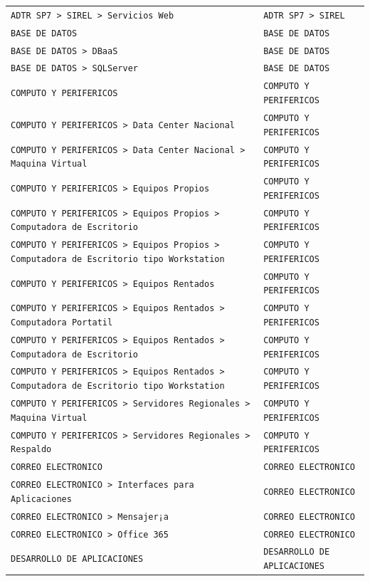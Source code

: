 \begin{longtable}{>{\raggedright\arraybackslash}p{} >{\raggedright\arraybackslash}p{}}
\texttt{ADTR SP7 > SIREL > Servicios Web} & \texttt{ADTR SP7 > SIREL} \\
\texttt{BASE DE DATOS} & \texttt{BASE DE DATOS} \\
\texttt{BASE DE DATOS > DBaaS} & \texttt{BASE DE DATOS} \\
\texttt{BASE DE DATOS > SQLServer} & \texttt{BASE DE DATOS} \\
\texttt{COMPUTO Y PERIFERICOS} & \texttt{COMPUTO Y PERIFERICOS} \\
\texttt{COMPUTO Y PERIFERICOS > Data Center Nacional} & \texttt{COMPUTO Y PERIFERICOS} \\
\texttt{COMPUTO Y PERIFERICOS > Data Center Nacional > Maquina Virtual} & \texttt{COMPUTO Y PERIFERICOS} \\
\texttt{COMPUTO Y PERIFERICOS > Equipos Propios} & \texttt{COMPUTO Y PERIFERICOS} \\
\texttt{COMPUTO Y PERIFERICOS > Equipos Propios > Computadora de Escritorio} & \texttt{COMPUTO Y PERIFERICOS} \\
\texttt{COMPUTO Y PERIFERICOS > Equipos Propios > Computadora de Escritorio tipo Workstation} & \texttt{COMPUTO Y PERIFERICOS} \\
\texttt{COMPUTO Y PERIFERICOS > Equipos Rentados} & \texttt{COMPUTO Y PERIFERICOS} \\
\texttt{COMPUTO Y PERIFERICOS > Equipos Rentados > Computadora Portatil} & \texttt{COMPUTO Y PERIFERICOS} \\
\texttt{COMPUTO Y PERIFERICOS > Equipos Rentados > Computadora de Escritorio} & \texttt{COMPUTO Y PERIFERICOS} \\
\texttt{COMPUTO Y PERIFERICOS > Equipos Rentados > Computadora de Escritorio tipo Workstation} & \texttt{COMPUTO Y PERIFERICOS} \\
\texttt{COMPUTO Y PERIFERICOS > Servidores Regionales > Maquina Virtual} & \texttt{COMPUTO Y PERIFERICOS} \\
\texttt{COMPUTO Y PERIFERICOS > Servidores Regionales > Respaldo} & \texttt{COMPUTO Y PERIFERICOS} \\
\texttt{CORREO ELECTRONICO} & \texttt{CORREO ELECTRONICO} \\
\texttt{CORREO ELECTRONICO > Interfaces para Aplicaciones} & \texttt{CORREO ELECTRONICO} \\
\texttt{CORREO ELECTRONICO > Mensajer¡a} & \texttt{CORREO ELECTRONICO} \\
\texttt{CORREO ELECTRONICO > Office 365} & \texttt{CORREO ELECTRONICO} \\
\texttt{DESARROLLO DE APLICACIONES} & \texttt{DESARROLLO DE APLICACIONES} \\

\end{longtable}
